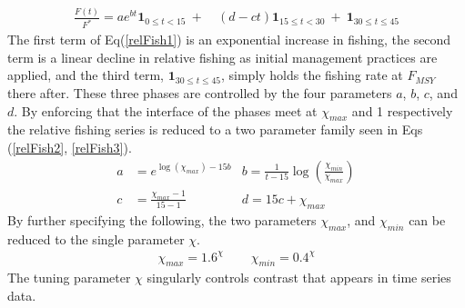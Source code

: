 \documentclass[12pt]{article}
\begin{document}
%
\clearpage
\vspace*{-2cm}
\begin{align}
	\frac{F(t)}{F^*} = a e^{b t}\bm{1}_{0\le t<15} ~+~&(d-c t)\bm{1}_{15\le t<30} ~+~ \bm{1}_{30\le t \le 45} \label{relFish1} %
\end{align}
%
The first term of Eq(\ref{relFish1}) is an exponential increase in fishing, 
the second term is a linear decline in relative fishing as initial management 
practices are applied, and the third term, $\bm{1}_{30\le t \le 45}$, simply 
holds the fishing rate at $F_{MSY}$ there after. These three phases are 
controlled by the four parameters $a$, $b$, $c$, and $d$. By enforcing that 
the interface of the phases meet at $\chi_{max}$ and 1 respectively
the relative fishing series is reduced to a two parameter family seen in 
Eqs (\ref{relFish2}, \ref{relFish3}). 
%
\begin{align}
        a &= e^{\log(\chi_{max})-15b} 	&b = \frac{1}{t-15}\log\left(\frac{\chi_{min}}{\chi_{max}}\right) \label{relFish2} \\ %
        c &= \frac{\chi_{max}-1}{15-1}  &d = 15c + \chi_{max} ~~~~~~~~~~~ \label{relFish3}
\end{align}
%
By further specifying the following, the two parameters $\chi_{max}$, and 
$\chi_{min}$ can be reduced to the single parameter $\chi$.
%
\begin{align}
\chi_{max} = 1.6^\chi ~~~&~~~ \chi_{min} = 0.4^\chi \label{relFish4}
\end{align}
The tuning parameter $\chi$ singularly %
controls contrast that appears in time series data. 
\end{document}
